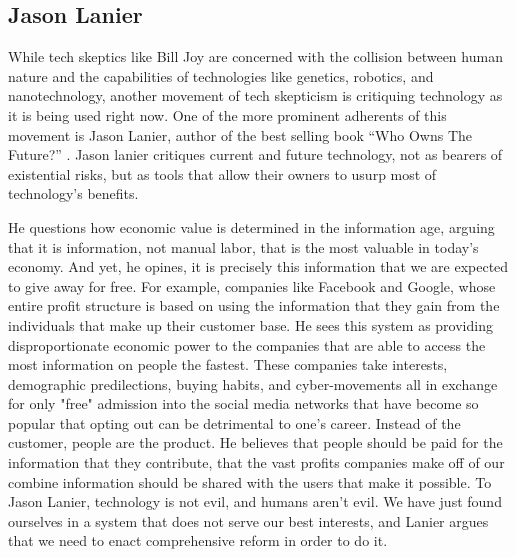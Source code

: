\subsection{Jason Lanier}
  While tech skeptics like Bill Joy are concerned with the 
  collision between human nature and the capabilities of technologies 
  like genetics, robotics, and nanotechnology, another movement of 
  tech skepticism is critiquing technology as it is being used right 
  now. One of the more prominent adherents of this movement is Jason 
  Lanier, author of the best selling book ``Who Owns The Future?''
  \cite{lanier2014owns}. Jason lanier critiques current and future 
  technology, not as bearers of existential risks, but as tools that 
  allow their owners to usurp most of technology's benefits. 
  
  He questions how economic value is determined in the information age, 
  arguing that it is information, not manual labor, that is the most 
  valuable in today's economy.  And yet, he opines, it is precisely this 
  information that we are expected to give away for free. For example, 
  companies like Facebook and Google, whose entire profit structure is 
  based on using the information that they gain from the individuals 
  that make up their customer base. He sees this system as providing 
  disproportionate economic power to the companies that are able to 
  access the most information on people the fastest.  These companies 
  take interests, demographic predilections, buying habits, and 
  cyber-movements all in exchange for only "free" admission into the 
  social media networks that have become so popular that opting out 
  can be detrimental to one's career. Instead of the customer, people 
  are the product.  He believes that people should be paid for the 
  information that they contribute, that the vast profits companies 
  make off of our combine information should be shared with the users 
  that make it possible.  To Jason Lanier, technology is not evil, and 
  humans aren't evil.  We have just found ourselves in a system that 
  does not serve our best interests, and Lanier argues that we need 
  to enact comprehensive reform in order to do it.

\label{sec:-jason}
